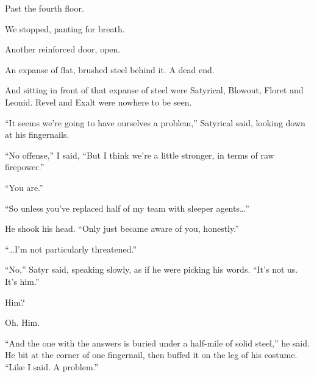 Past the fourth floor.



We stopped, panting for breath.



Another reinforced door, open.



An expanse of flat, brushed steel behind it.  A dead end.



And sitting in front of that expanse of steel were Satyrical, Blowout, Floret and Leonid.  Revel and Exalt were nowhere to be seen.



``It seems we're going to have ourselves a problem,'' Satyrical said, looking down at his fingernails.



``No offense,'' I said, ``But I think we're a little stronger, in terms of raw firepower.''



``You are.''



``So unless you've replaced half of my team with sleeper agents\ldots''



He shook his head.  ``Only just became aware of you, honestly.''



``\ldots{}I'm not particularly threatened.''



``No,'' Satyr said, speaking slowly, as if he were picking his words.  ``It's not us.  It's him.''



Him?



Oh.  Him.



``And the one with the answers is buried under a half-mile of solid steel,'' he said.  He bit at the corner of one fingernail, then buffed it on the leg of his costume.  ``Like I said.  A problem.''





